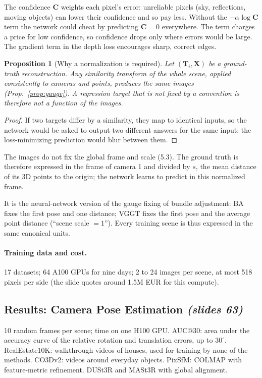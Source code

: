 \documentclass[11pt,a4paper]{article}
\newcommand{\slr}[1]{\texorpdfstring{\emph{(slides #1)}}{(slides #1)}}
\theoremstyle{definition}
\theoremstyle{plain}
\newtheorem{proposition}[definition]{Proposition}
\theoremstyle{remark}
\begin{document}
\begin{intuition}
The confidence $\bm C$ weights each pixel's error: unreliable pixels (sky, reflections, moving objects) can lower their confidence and so pay less. Without the $-\alpha\log\bm C$ term the network could cheat by predicting $\bm C=0$ everywhere. The term charges a price for low confidence, so confidence drops only where errors would be large. The gradient term in the depth loss encourages sharp, correct edges.
\end{intuition}

\begin{proposition}[Why a normalization is required]\label{prop:normal}
Let $(\bm T_i,\bm X)$ be a ground-truth reconstruction. Any similarity transform of the whole scene, applied consistently to cameras and points, produces the same images (Prop.~\ref{prop:gauge}). A regression target that is not fixed by a convention is therefore not a function of the images.
\end{proposition}
\begin{proof}
If two targets differ by a similarity, they map to identical inputs, so the network would be asked to output two different answers for the same input; the loss-minimizing prediction would blur between them.
\end{proof}

The images do not fix the global frame and scale (5.3). The ground truth is therefore expressed in the frame of camera 1 and divided by $s$, the mean distance of its 3D points to the origin; the network learns to predict in this normalized frame.

\begin{intuition}
It is the neural-network version of the gauge fixing of bundle adjustment: BA fixes the first pose and one distance; VGGT fixes the first pose and the average point distance (``scene scale $=1$''). Every training scene is thus expressed in the same canonical units.
\end{intuition}

\paragraph{Training data and cost.} 17 datasets; 64 A100 GPUs for nine days; 2 to 24 images per scene, at most 518 pixels per side (the slide quotes around 1.5M EUR for this compute).

\subsection{Results: Camera Pose Estimation \slr{63}}
10 random frames per scene; time on one H100 GPU. AUC@30: area under the accuracy curve of the relative rotation and translation errors, up to $30^\circ$. RealEstate10K: walkthrough videos of houses, used for training by none of the methods. CO3Dv2: videos around everyday objects. PixSfM: COLMAP with feature-metric refinement. DUSt3R and MASt3R with global alignment.
\end{document}
